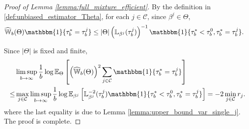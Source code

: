 \documentclass[aap,preprint]{imsart}
\newcommand{\Pro}{{\mathbb{P}}}
\newcommand{\Exp}{{\mathbb{E}}}
\newcommand{\cF}{\mathcal{F}}
\theoremstyle{plain}
\theoremstyle{definition}
\begin{document}
\begin{appendix}
\begin{proof}[Proof of Lemma \ref{lemma:full_mixture_efficient}]
By the definition in \eqref{def:unbiased_estimator_Theta}, for each $j \in \mathcal{C}$, since $\beta^j \in \Theta$,
\begin{align}\label{aux_Wb_j_bound}
  \widehat{\mathbb{W}}_{b}(\Theta) \mathbbm{1}\{\tau_b^* = \tau_b^j\} & \leq |\Theta| 
   \left(   
\mathbb{L}_{\beta^j}(\tau_b^j) \right)^{-1} \mathbbm{1}\{\tau_b^* < \tau_b^0, \tau_b^* = \tau_b^j\}.
\end{align}  

Since $|\Theta|$ is fixed and finite,
\begin{align*}
   & \limsup_{b\to \infty} \frac{1}{b} \log       \Exp_{\Theta}\left[ \left(\widehat{\mathbb{W}}_{b}(\Theta)\right)^2 \sum_{j \in \mathcal{C}} \mathbbm{1}\{\tau_b^* = \tau_b^j\}\right]  \\
   \leq & \max_{j \in \mathcal{C}} \limsup_{b\to \infty} \frac{1}{b} \log       \Exp_{\beta^j}\left[ \mathbb{L}_{\beta^j}^{-2}(\tau_b^j)  \mathbbm{1}\{\tau_b^* < \tau_b^0,  \tau_b^* = \tau_b^j\} \right] = -2 \min_{j \in \mathcal{C}} r_j.
\end{align*}
where the last equality is due to Lemma \ref{lemma:upper_bound_var_single_j}.
The proof is complete.
\end{proof}


\end{appendix}
\end{document}
